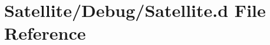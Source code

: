\hypertarget{_debug_2_satellite_8d}{\section{Satellite/\-Debug/\-Satellite.d File Reference}
\label{_debug_2_satellite_8d}
}
